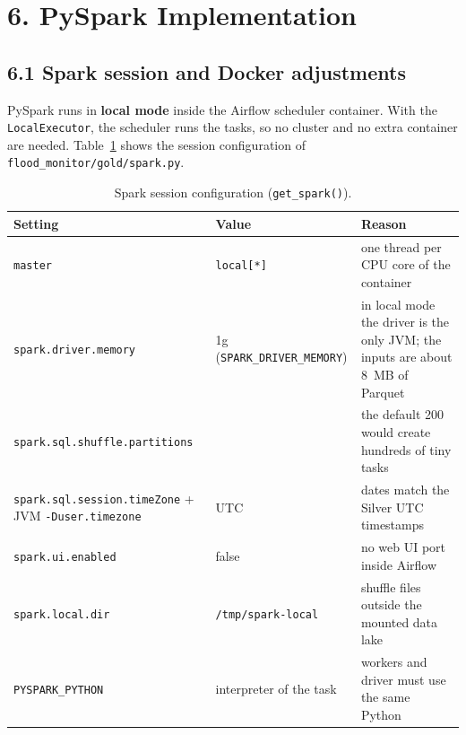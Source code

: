 \documentclass[stu, 12pt, letterpaper, donotrepeattitle, floatsintext, natbib]{apa7}
\begin{document}
\section{\large 6. PySpark Implementation}
\subsection{6.1 Spark session and Docker adjustments}
PySpark runs in \textbf{local mode} inside the Airflow scheduler container. With the \texttt{LocalExecutor}, the scheduler runs the tasks, so no cluster and no extra container are needed. Table~\ref{tab:sparkconf} shows the session configuration of \texttt{flood\_monitor/gold/spark.py}.

\begin{table}[H]
\centering
\scriptsize
\caption{Spark session configuration (\texttt{get\_spark()}).}
\label{tab:sparkconf}
\begin{tabularx}{\textwidth}{>{\raggedright\arraybackslash}p{4.4cm} >{\raggedright\arraybackslash}p{3.0cm} >{\raggedright\arraybackslash}X}
\toprule
\textbf{Setting} & \textbf{Value} & \textbf{Reason} \\
\midrule
\texttt{master} & \texttt{local[*]} & one thread per CPU core of the container \\
\texttt{spark.driver.memory} & 1g (\texttt{SPARK\_DRIVER\_MEMORY}) & in local mode the driver is the only JVM; the inputs are about 8~MB of Parquet \\
\texttt{spark.sql.shuffle.partitions} & 8 & the default 200 would create hundreds of tiny tasks \\
\texttt{spark.sql.session.timeZone} + JVM \texttt{-Duser.timezone} & UTC & dates match the Silver UTC timestamps \\
\texttt{spark.ui.enabled} & false & no web UI port inside Airflow \\
\texttt{spark.local.dir} & \texttt{/tmp/\allowbreak spark-local} & shuffle files outside the mounted data lake \\
\texttt{PYSPARK\_PYTHON} & interpreter of the task & workers and driver must use the same Python \\
\bottomrule
\end{tabularx}
\end{table}
\end{document}
